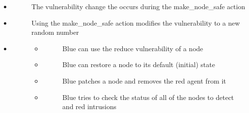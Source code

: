 \documentclass[letterpaper,10pt,english]{sphinxmanual}
\begin{document}
\begin{itemize}
\begin{description}
\end{description}

\item {} \begin{description}
\item[{}] \leavevmode
\sphinxAtStartPar
The vulnerability change the occurs during the make\_node\_safe action

\end{description}

\item {} \begin{description}
\item[{}] \leavevmode
\sphinxAtStartPar
Using the make\_node\_safe action modifies the vulnerability to a new random number

\end{description}

\item {} \begin{description}
\item[{}] \leavevmode\begin{itemize}
\item {} \begin{description}
\item[{}] \leavevmode
\sphinxAtStartPar
Blue can use the reduce vulnerability of a node

\end{description}

\item {} \begin{description}
\item[{}] \leavevmode
\sphinxAtStartPar
Blue can restore a node to its default (initial) state

\end{description}

\item {} \begin{description}
\item[{}] \leavevmode
\sphinxAtStartPar
Blue patches a node and removes the red agent from it

\end{description}

\item {} \begin{description}
\item[{}] \leavevmode
\sphinxAtStartPar
Blue tries to check the status of all of the nodes to detect and red intrusions


\end{description}
\end{itemize}
\end{description}
\end{itemize}
\end{document}
